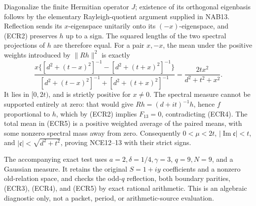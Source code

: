 Diagonalize the finite Hermitian operator \(J\); existence of its
orthogonal eigenbasis follows by the elementary Rayleigh-quotient
argument supplied in NAB13.
Reflection sends its \(x\)-eigenspace unitarily onto its
\((-x)\)-eigenspace, and (ECR2) preserves \(h\) up to a sign.
The squared lengths of the two spectral projections of \(h\) are
therefore equal.  For a pair \(x,-x\), the mean under the positive
weights introduced by \(\|Rh\|^2\) is exactly
\begin{equation}
 \frac{x\{[d^2+(t-x)^2]^{-1}-[d^2+(t+x)^2]^{-1}\}}
 {[d^2+(t-x)^2]^{-1}+[d^2+(t+x)^2]^{-1}}
   =\frac{2tx^2}{d^2+t^2+x^2}.
 \tag{ECR6}
\end{equation}
It lies in \([0,2t)\), and is strictly positive for \(x\ne0\).
The spectral measure cannot be supported entirely at zero: that
would give \(Rh=(d+it)^{-1}h\), hence \(f\) proportional to \(h\),
which by (ECR2) implies \(F_{13}=0\), contradicting (ECR4).
The total mean in (ECR5) is a positive weighted average of the
paired means, with some nonzero spectral mass away from zero.
Consequently \(0<\mu<2t\),
\(|\operatorname{Im}\mathfrak c|<t\), and
\(|\mathfrak c|<\sqrt{d^2+t^2}\), proving NCE12--13 with their
strict signs.

The accompanying exact test uses \(a=2,\delta=1/4,\gamma=3\),
\(q=9,N=9\), and a Gaussian measure.  It retains the original
\(S=1+iy\) coefficients and a nonzero old-relation space, and checks
the odd-\(q\) reflection, both boundary parities, (ECR3), (ECR4),
and (ECR5) by exact rational arithmetic.
This is an algebraic diagnostic only, not a packet, period, or
arithmetic-source evaluation.

